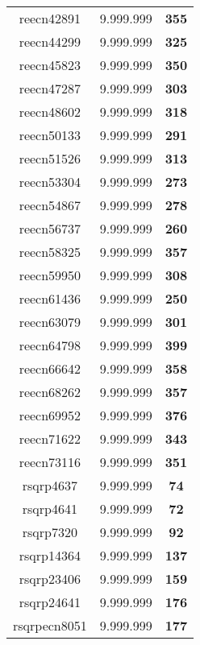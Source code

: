 \begin{tabular}{cc||c}
reecn42891       & 9.999.999        & {\bf 355}       \\ 
reecn44299       & 9.999.999        & {\bf 325}       \\ 
reecn45823       & 9.999.999        & {\bf 350}       \\ 
reecn47287       & 9.999.999        & {\bf 303}       \\ 
reecn48602       & 9.999.999        & {\bf 318}       \\ 
reecn50133       & 9.999.999        & {\bf 291}       \\ 
reecn51526       & 9.999.999        & {\bf 313}       \\ 
reecn53304       & 9.999.999        & {\bf 273}       \\ 
reecn54867       & 9.999.999        & {\bf 278}       \\ 
reecn56737       & 9.999.999        & {\bf 260}       \\ 
reecn58325       & 9.999.999        & {\bf 357}       \\ 
reecn59950       & 9.999.999        & {\bf 308}       \\ 
reecn61436       & 9.999.999        & {\bf 250}       \\ 
reecn63079       & 9.999.999        & {\bf 301}       \\ 
reecn64798       & 9.999.999        & {\bf 399}       \\ 
reecn66642       & 9.999.999        & {\bf 358}       \\ 
reecn68262       & 9.999.999        & {\bf 357}       \\ 
reecn69952       & 9.999.999        & {\bf 376}       \\ 
reecn71622       & 9.999.999        & {\bf 343}       \\ 
reecn73116       & 9.999.999        & {\bf 351}       \\ 
rsqrp4637        & 9.999.999        & {\bf 74}        \\ 
rsqrp4641        & 9.999.999        & {\bf 72}        \\ 
rsqrp7320        & 9.999.999        & {\bf 92}        \\ 
rsqrp14364       & 9.999.999        & {\bf 137}       \\ 
rsqrp23406       & 9.999.999        & {\bf 159}       \\ 
rsqrp24641       & 9.999.999        & {\bf 176}       \\ 
rsqrpecn8051     & 9.999.999        & {\bf 177}       \\ 

\end{tabular}
